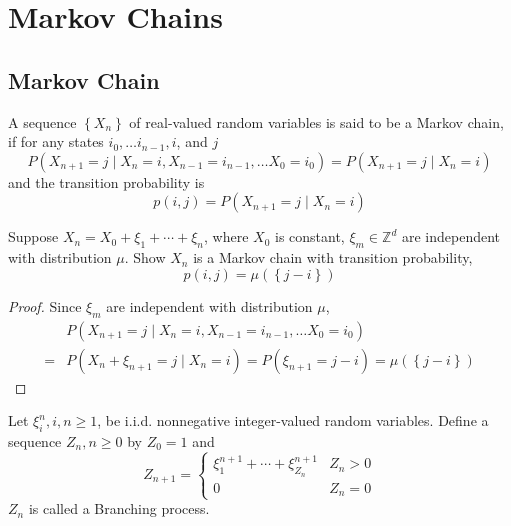\chapter{Markov Chains}

\section{Markov Chain}

\begin{definition}
    A sequence $\left\{X_{n}\right\}$ of real-valued random variables  is said to be a Markov chain, if for any states $i_{0},\ldots i_{n-1},i$, and $j$
    \begin{equation}
        P\left(X_{n+1}=j\mid X_{n}=i,X_{n-1}=i_{n-1},\ldots X_{0}=i_{0}\right)=P\left(X_{n+1}=j\mid X_{n}=i\right)
    \end{equation}
    and the transition probability is
    \begin{equation}
        p(i,j)=P\left(X_{n+1}=j\mid X_{n}=i\right)
    \end{equation}
\end{definition}

\begin{example}
    Suppose $X_{n}=X_{0}+\xi_{1}+\cdots+\xi_{n}$, where $X_{0}$ is constant, $\xi_{m}\in\mathbb{Z}^{d}$ are independent with distribution $\mu$. Show $X_{n}$ is a Markov chain with transition probability,
    \begin{equation*}
        p\left(i,j\right)=\mu\left(\left\{j-i\right\}\right)
    \end{equation*}
\end{example}

\begin{proof}
    Since $\xi_{m}$ are independent with distribution $\mu$,
    \begin{equation*}
        \begin{aligned}
              & P\left(X_{n+1}=j\mid X_{n}=i,X_{n-1}=i_{n-1},\ldots X_{0}=i_{0}\right)                                     \\
            = & P\left(X_{n}+\xi_{n+1}=j\mid X_{n}=i\right)=P\left(\xi_{n+1}=j-i\right)=\mu\left(\left\{j-i\right\}\right)
        \end{aligned}
    \end{equation*}
\end{proof}

\begin{definition}
    Let $\xi_{i}^{n},i,n\geq 1$, be i.i.d. nonnegative integer-valued random variables. Define a sequence $Z_{n},n\geq 0$ by $Z_{0}=1$ and
    \begin{equation}
        Z_{n+1}=\left\{\begin{array}{ll}
            \xi_{1}^{n+1}+\cdots+\xi_{Z_{n}}^{n+1} & Z_{n}>0 \\
            0                                      & Z_{n}=0
        \end{array}\right.
    \end{equation}
    $Z_{n}$ is called a Branching process.
\end{definition}

